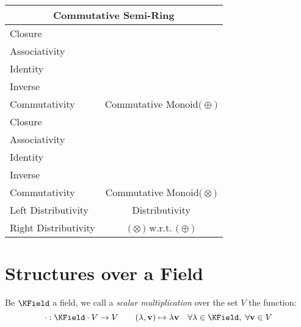 \documentclass[a4paper,12pt]{scrartcl}
\newcommand{\OpA}{\otimes}
\newcommand{\OpB}{\oplus}
\begin{document}
\begin{minipage}[c]{0,5\textwidth}
\vspace{0.6cm}
\begin{tabular}{|l|c|} %
  \hline
  \multicolumn{2}{c}{\cellcolor{green!25}Commutative Semi-Ring} \\
  \hline
    \cellcolor{blue!25} Closure& \cellcolor{yellow!25}  \\
    \cellcolor{blue!25} Associativity& \cellcolor{yellow!25}  \\
    \cellcolor{blue!25} Identity& \cellcolor{yellow!25} \\
    \cellcolor{red!25} Inverse& \cellcolor{yellow!25} \\
    \cellcolor{blue!25} Commutativity& \multirow{-5}{*}{\tiny\cellcolor{yellow!25}Commutative Monoid$\big(\OpB\big)$} \\
   \hline
    \cellcolor{blue!25} Closure& \cellcolor{yellow!25}  \\
    \cellcolor{blue!25} Associativity& \cellcolor{yellow!25}  \\
    \cellcolor{blue!25} Identity& \cellcolor{yellow!25} \\
    \cellcolor{red!25} Inverse& \cellcolor{yellow!25} \\
    \cellcolor{blue!25} Commutativity& \multirow{-5}{*}{\tiny\cellcolor{yellow!25}Commutative Monoid$\big(\OpA\big)$} \\
  \hline
  	\cellcolor{blue!25} Left Distributivity&  \tiny\cellcolor{yellow!25}Distributivity\\
    \cellcolor{blue!25} Right Distributivity & \tiny\cellcolor{yellow!25} $\big(\OpA\big)$ w.r.t. $\big(\OpB\big)$  \\
   \hline
\end{tabular}

\end{minipage}

\newpage
\section{Structures over a Field}
Be $\KField$ a field, we call a \emph{scalar multiplication} over the set $V$ the function:
	\begin{displaymath}
		\cdot : \KField \cdot V \rightarrow  V \qquad (\lambda, \mathbf{v}) \mapsto \lambda \mathbf{v} \quad \forall \lambda \in \KField,\; 
		\forall \mathbf{v} \in V
	\end{displaymath}
\end{document}

